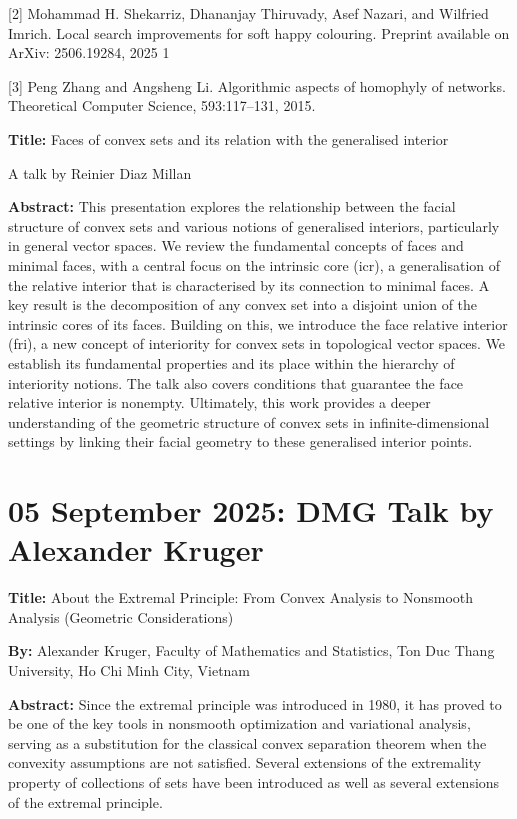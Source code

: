 \documentclass[10pt,twoside,a5paper]{scrreprt}
\begin{document}
  [2] Mohammad H. Shekarriz, Dhananjay Thiruvady, Asef Nazari, and
  Wilfried Imrich. Local search improvements for soft happy colouring.
  Preprint available on ArXiv: 2506.19284, 2025 1

  [3] Peng Zhang and
  Angsheng Li. Algorithmic aspects of homophyly of networks. Theoretical
  Computer Science, 593:117--131, 2015.

  \textbf{Title:} Faces of convex sets and its relation with the
  generalised interior

  A talk by Reinier Diaz Millan

  \textbf{Abstract:} This presentation explores the relationship between
  the facial structure of convex sets and various notions of generalised
  interiors, particularly in general vector spaces. We review the
  fundamental concepts of faces and minimal faces, with a central focus
  on the intrinsic core (icr), a generalisation of the relative interior
  that is characterised by its connection to minimal faces. A key result
  is the decomposition of any convex set into a disjoint union of the
  intrinsic cores of its faces. Building on this, we introduce the face
  relative interior (fri), a new concept of interiority for convex sets
  in topological vector spaces. We establish its fundamental properties
  and its place within the hierarchy of interiority notions. The talk
  also covers conditions that guarantee the face relative interior is
  nonempty. Ultimately, this work provides a deeper understanding of the
  geometric structure of convex sets in infinite-dimensional settings by
  linking their facial geometry to these generalised interior points.

  \section*{05 September 2025: DMG Talk by  Alexander Kruger}

    \textbf{Title:} About the Extremal Principle: From Convex Analysis to Nonsmooth Analysis (Geometric Considerations)

    \textbf{By:}  Alexander Kruger, Faculty of Mathematics and Statistics, Ton Duc Thang University, Ho Chi Minh City, Vietnam

    \textbf{Abstract:} Since the extremal principle was introduced in 1980, it has proved to be one of the key tools in nonsmooth optimization and variational analysis, serving as a substitution for the classical convex separation theorem when the convexity assumptions are not satisfied. Several extensions of the extremality property of collections of sets have been introduced as well as several extensions of the extremal principle.
\end{document}
